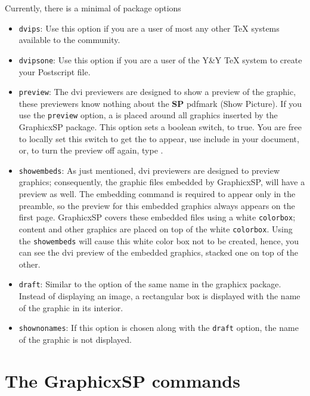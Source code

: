 \documentclass{article}
\let\pkg\textsf
\begin{document}
Currently, there is a minimal of package options

\begin{itemize}
\item \texttt{dvips}: Use this option if you are a user of most any other
    {\TeX} systems available to the community.
\item \texttt{dvipsone}: Use this option if you are a user of the Y{\small\&}\!Y
    {\TeX} system to create your Postscript file.
\item \texttt{preview}: The dvi previewers are designed to show a preview
    of the graphic, these previewers know nothing about the \textbf{SP}
    pdfmark (Show Picture). If you use the \texttt{preview} option, a
     is placed around all graphics inserted by the
    \pkg{GraphicxSP} package. This option sets a boolean switch,
     to true. You are free to locally set this switch to get
    the  to appear, use include  in your document,
    or, to turn the preview off again, type .
\item \texttt{showembeds}: As just mentioned, dvi previewers are
    designed to preview graphics; consequently, the graphic files
    embedded by \pkg{GraphicxSP}, will have a preview as well. The
    embedding command  is required to appear only in
    the preamble, so the preview for this embedded graphics always
    appears on the first page. \pkg{GraphicxSP} covers these embedded
    files using a white \texttt{colorbox}; content and other
    graphics are placed on top of the white \texttt{colorbox}. Using
    the \texttt{showembeds} will cause this white color box not to
    be created, hence, you can see the dvi preview of the embedded
    graphics, stacked one on top of the other.
\item \texttt{draft}: Similar to the option of the same name in the
    graphicx package. Instead of displaying an image, a rectangular
    box is displayed with the name of the graphic in its interior.
\item \texttt{shownonames}: If this option is chosen along with
    the \texttt{draft} option, the name of the graphic is not displayed.
\end{itemize}

\section{The \texorpdfstring{\protect\pkg{GraphicxSP}}{GraphicxSP} commands}
\end{document}
